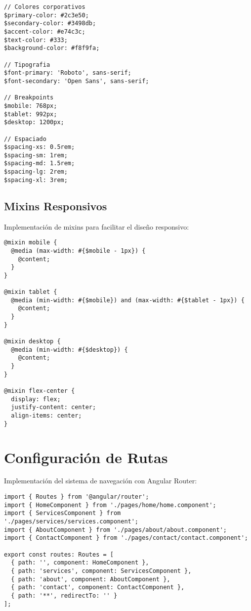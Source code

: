 \begin{lstlisting}[caption=Variables SCSS]
// Colores corporativos
$primary-color: #2c3e50;
$secondary-color: #3498db;
$accent-color: #e74c3c;
$text-color: #333;
$background-color: #f8f9fa;

// Tipografia
$font-primary: 'Roboto', sans-serif;
$font-secondary: 'Open Sans', sans-serif;

// Breakpoints
$mobile: 768px;
$tablet: 992px;
$desktop: 1200px;

// Espaciado
$spacing-xs: 0.5rem;
$spacing-sm: 1rem;
$spacing-md: 1.5rem;
$spacing-lg: 2rem;
$spacing-xl: 3rem;
\end{lstlisting}

\subsection{Mixins Responsivos}

Implementación de mixins para facilitar el diseño responsivo:

\begin{lstlisting}[caption=Responsive Mixins]
@mixin mobile {
  @media (max-width: #{$mobile - 1px}) {
    @content;
  }
}

@mixin tablet {
  @media (min-width: #{$mobile}) and (max-width: #{$tablet - 1px}) {
    @content;
  }
}

@mixin desktop {
  @media (min-width: #{$desktop}) {
    @content;
  }
}

@mixin flex-center {
  display: flex;
  justify-content: center;
  align-items: center;
}
\end{lstlisting}

\section{Configuración de Rutas}

Implementación del sistema de navegación con Angular Router:

\begin{lstlisting}[caption=App Routes Configuration]
import { Routes } from '@angular/router';
import { HomeComponent } from './pages/home/home.component';
import { ServicesComponent } from './pages/services/services.component';
import { AboutComponent } from './pages/about/about.component';
import { ContactComponent } from './pages/contact/contact.component';

export const routes: Routes = [
  { path: '', component: HomeComponent },
  { path: 'services', component: ServicesComponent },
  { path: 'about', component: AboutComponent },
  { path: 'contact', component: ContactComponent },
  { path: '**', redirectTo: '' }
];
\end{lstlisting}

